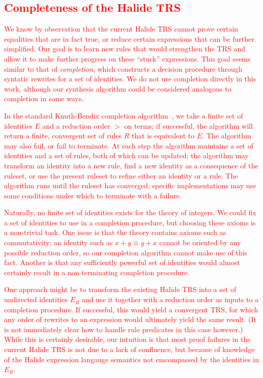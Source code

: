 \documentclass[acmsmall,review,anonymous]{acmart}\settopmatter{printfolios=true,printccs=false,printacmref=false}
\newcommand{\modified}[1]{\textcolor{red}{{#1}}}
\begin{document}
\subsection{\modified{Completeness of the Halide TRS}}

\modified{We know by observation that the current Halide TRS cannot prove certain equalities 
that are in fact true, or reduce certain expressions that can be further simplified. 
Our goal is to learn new rules that would strengthen the TRS and allow it to make
further progress on these ``stuck'' expressions. This goal seems similar to that of 
\emph{completion}, which constructs a decision procedure through syntatic rewrites
for a set of identities. We do not use completion directly in this work, although
our synthesis algorithm could be considered analogous to completion in some ways.}

\modified{In the standard Knuth-Bendix completion algorithm~\cite{knuth1983simple}, we take a
finite set of identities $E$ and a reduction order $>$ on terms; if successful, the
algorithm will return a finite, convergent set of rules $R$ that is equivalent to 
$E$. The algorithm may also fail, or fail to terminate. At each step the algorithm
maintains a set of identities and a set of rules, both of which can be updated; the 
algorithm may transform an identity into a new rule, find a new identity as a 
consequence of the ruleset, or use the present ruleset to refine either an identity 
or a rule. The algorithm runs until the ruleset has converged; specific implementations
may use some conditions under which to terminate with a failure.}

\modified{Naturally, no finite set of identities exists for the theory of integers. We could
fix a set of identities to use in a completion procedure, but choosing these axioms
is a non-trivial task. One issue is that the theory contains axioms such as commutativity;
an identity such as $x + y \equiv y + x$ cannot be oriented by any possible reduction 
order, so our completion algorithm cannot make use of this fact. Another is that any
sufficiently powerful set of identities would almost certainly result in a non-terminating
completion procedure.}

\modified{One approach might be to transform the existing Halide TRS into a set of undirected
identities $E_R$ and use it together with a reduction order as inputs to a completion procedure. 
If successful, this would yield a convergent TRS, for which any order of rewrites to 
an expression would ultimately yield the same result. (It is not immediately clear how 
to handle rule predicates in this case however.) While this is certainly desirable, 
our intuition is that most proof failures in the current Halide TRS is not due to a 
lack of confluence, but because of knowledge of the Halide expression langauge semantics 
not emcompassed by the identities in $E_R$.}
\end{document}
